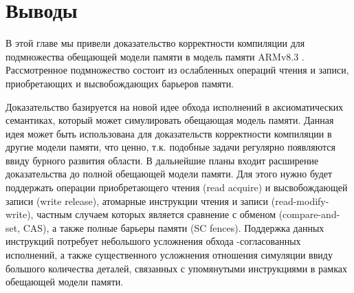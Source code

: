 \section{Выводы}
В этой главе мы привели доказательство корректности компиляции для подмножества
обещающей модели памяти \cite{Kang-al:POPL17} в модель памяти ARMv8.3 \cite{Pulte-al:POPL18}.
Рассмотренное подмножество состоит из ослабленных операций чтения и записи, приобретающих и высвобождающих барьеров памяти. 

Доказательство базируется на новой идее обхода исполнений в аксиоматических
семантиках, который может симулировать обещающая модель памяти. 
Данная идея может быть использована для доказательств
корректности компиляции в другие модели памяти, что ценно, т.к. подобные задачи регулярно появляются
ввиду бурного развития области.
В дальнейшие планы входит расширение доказательства
до полной обещающей модели памяти. Для этого нужно будет поддержать операции
приобретающего чтения (read acquire) и высвобождающей записи (write release),
атомарные инструкции чтения и записи (read-modify-write), частным случаем которых
является сравнение с обменом (compare-and-set, CAS), а также полные барьеры памяти (SC fences).
Поддержка данных инструкций потребует небольшого усложнения обхода \ARM-согласованных
исполнений, а также существенного усложнения отношения симуляции ввиду большого количества деталей,
связанных с упомянутыми инструкциями в рамках обещающей модели памяти.
